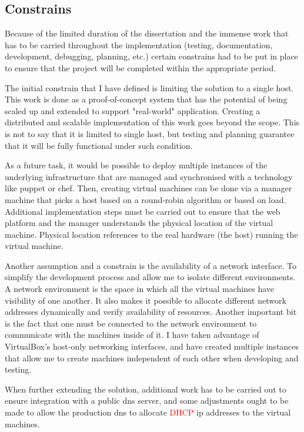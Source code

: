\documentclass{article}
\begin{document}
\subsection{Constrains}
Because of the limited duration of the dissertation and the immense work that has to be carried throughout the implementation (testing, documentation, development, debugging, planning, etc.) certain constrains had to be put in place to ensure that the project will be completed within the appropriate period.

The initial constrain that I have defined is limiting the solution to a single host. This work is done as a proof-of-concept system that has the potential of being scaled up and extended to support "real-world" application.
Creating a distributed and scalable implementation of this work goes beyond the scope. This is not to say that it is limited to single host, but testing and planning guarantee that it will be fully functional under such condition.

As a future task, it would be possible to deploy multiple instances of the underlying infrastructure that are managed and synchronised with a technology like puppet or chef. Then, creating virtual machines can be done via a manager machine that picks a host based on a round-robin algorithm or based on load. Additional implementation steps must be carried out to ensure that the web platform and the manager understands the physical location of the virtual machine. Physical location references to the real hardware (the host) running the virtual machine.

Another assumption and a constrain is the availability of a network interface. To simplify the development process and allow me to isolate different environments. A network environment is the space in which all the virtual machines have visibility of one another. It also makes it possible to allocate different network addresses dynamically and verify availability of resources. Another important bit is the fact that one must be connected to the network environment to communicate with the machines inside of it. I have taken advantage of VirtualBox's host-only networking interfaces, and have created multiple instances that allow me to create machines independent of each other when developing and testing.

When further extending the solution, additional work has to be carried out to ensure integration with a public \gls{dns} server, and some adjustments ought to be made to allow the production \gls{dns} to allocate \textcolor{red}{DHCP} ip addresses to the virtual machines.
\end{document}

